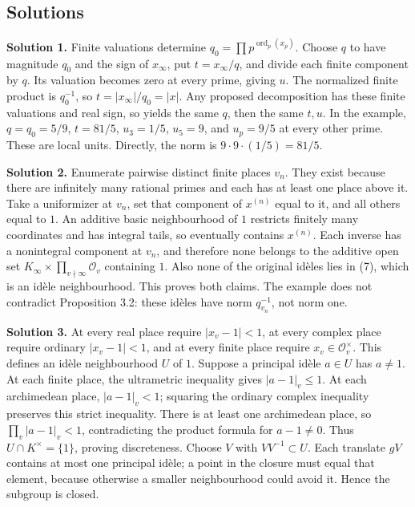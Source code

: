 \documentclass[
  english,
  11pt,
  a4paper,
]{article}
\newcounter{none} %
\begin{document}
\subsection{Solutions}\label{NT-ADL-03--solutions}

\textbf{Solution 1.} Finite valuations determine
\(q_0=\prod p^{\operatorname{ord}_p(x_p)}\). Choose \(q\) to have
magnitude \(q_0\) and the sign of \(x_\infty\), put \(t=x_\infty/q\),
and divide each finite component by \(q\). Its valuation becomes zero at
every prime, giving \(u\). The normalized finite product is
\(q_0^{-1}\), so \(t=|x_\infty|/q_0=|x|\). Any proposed decomposition
has these finite valuations and real sign, so yields the same \(q\),
then the same \(t,u\). In the example, \(q=q_0=5/9\), \(t=81/5\),
\(u_3=1/5\), \(u_5=9\), and \(u_p=9/5\) at every other prime. These are
local units. Directly, the norm is \(9\cdot9\cdot(1/5)=81/5\).

\textbf{Solution 2.} Enumerate pairwise distinct finite places \(v_n\).
They exist because there are infinitely many rational primes and each
has at least one place above it. Take a uniformizer at \(v_n\), set that
component of \(x^{(n)}\) equal to it, and all others equal to \(1\). An
additive basic neighbourhood of \(1\) restricts finitely many
coordinates and has integral tails, so eventually contains \(x^{(n)}\).
Each inverse has a nonintegral component at \(v_n\), and therefore none
belongs to the additive open set
\(K_\infty\times\prod_{v\nmid\infty}\mathcal O_v\) containing \(1\).
Also none of the original idèles lies in (7), which is an idèle
neighbourhood. This proves both claims. The example does not contradict
Proposition 3.2: these idèles have norm \(q_{v_n}^{-1}\), not norm one.

\textbf{Solution 3.} At every real place require \(|x_v-1|<1\), at every
complex place require ordinary \(|x_v-1|<1\), and at every finite place
require \(x_v\in\mathcal O_v^\times\). This defines an idèle
neighbourhood \(U\) of \(1\). Suppose a principal idèle \(a\in U\) has
\(a\ne1\). At each finite place, the ultrametric inequality gives
\(|a-1|_v\leq1\). At each archimedean place, \(|a-1|_v<1\); squaring the
ordinary complex inequality preserves this strict inequality. There is
at least one archimedean place, so \(\prod_v|a-1|_v<1\), contradicting
the product formula for \(a-1\ne0\). Thus \(U\cap K^\times=\{1\}\),
proving discreteness. Choose \(V\) with \(VV^{-1}\subset U\). Each
translate \(gV\) contains at most one principal idèle; a point in the
closure must equal that element, because otherwise a smaller
neighbourhood could avoid it. Hence the subgroup is closed.
\end{document}
